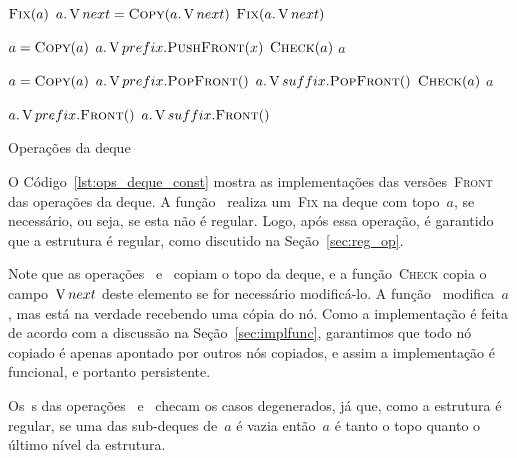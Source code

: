 \documentclass[../../main.tex]{subfiles}
\begin{document}
\begin{algorithm}
\begin{algorithmic}[1]

        \State $\Call{Fix}{a}$
        \State $a.\V{next} = \Call{Copy}{a.\V{next}}$
        \State $\Call{Fix}{a.\V{next}}$
    \EndIf
\EndFunction

    \State $a = \Call{Copy}{a}$
    \State $a.\V{prefix}.\Call{PushFront}{x}$
    \State $\Call{Check}{a}$
    \State \Return $a$
\EndFunction

    \State $a = \Call{Copy}{a}$
        \State $a.\V{prefix}.\Call{PopFront}{\null}$
    \Else
        \State $a.\V{suffix}.\Call{PopFront}{\null}$
    \EndIf
    \State $\Call{Check}{a}$
    \State \Return $a$
\EndFunction

        \State \Return $a.\V{prefix}.\Call{Front}{\null}$
    \Else
        \State \Return $a.\V{suffix}.\Call{Front}{\null}$
    \EndIf
\EndFunction

\end{algorithmic}
\caption{Operações da deque} \label{lst:ops_deque_const}
\end{algorithm}

O Código~\ref{lst:ops_deque_const} mostra as implementações das versões~\textsc{Front} das operações da deque. A função~ realiza um~\textsc{Fix} na deque com topo~$a$, se necessário, ou seja, se esta não é regular. Logo, após essa operação, é garantido que a estrutura é regular, como discutido na Seção~\ref{sec:reg_op}.

Note que as operações~ e~ copiam o topo da deque, e a função~\textsc{Check} copia o campo~$\operatorname{V}{next}$ deste elemento se for necessário modificá-lo. A função~ modifica~$a$, mas está na verdade recebendo uma cópia do nó. Como a implementação é feita de acordo com a discussão na Seção~\ref{sec:implfunc}, garantimos que todo nó copiado é apenas apontado por outros nós copiados, e assim a implementação é funcional, e portanto persistente.

Os~s das operações~ e~ checam os casos degenerados, já que, como a estrutura é regular, se uma das sub-deques de~$a$ é vazia então~$a$ é tanto o topo quanto o último nível da estrutura.
\end{document}
